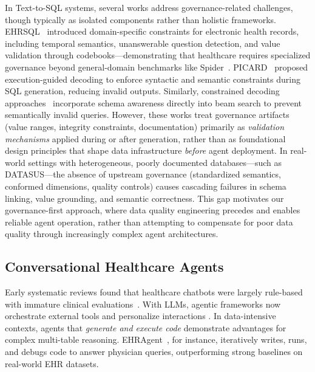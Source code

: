 \documentclass[sigconf,natbib=false]{acmart}
\begin{document}
In Text-to-SQL systems, several works address governance-related challenges, though typically as isolated components rather than holistic frameworks. EHRSQL~\cite{lee2023ehrsql} introduced domain-specific constraints for electronic health records, including temporal semantics, unanswerable question detection, and value validation through codebooks—demonstrating that healthcare requires specialized governance beyond general-domain benchmarks like Spider~\cite{yu2018spider}. PICARD~\cite{scholak2021picard} proposed execution-guided decoding to enforce syntactic and semantic constraints during SQL generation, reducing invalid outputs. Similarly, constrained decoding approaches~\cite{wang2018eg} incorporate schema awareness directly into beam search to prevent semantically invalid queries. However, these works treat governance artifacts (value ranges, integrity constraints, documentation) primarily as \emph{validation mechanisms} applied during or after generation, rather than as foundational design principles that shape data infrastructure \emph{before} agent deployment. In real-world settings with heterogeneous, poorly documented databases—such as DATASUS—the absence of upstream governance (standardized semantics, conformed dimensions, quality controls) causes cascading failures in schema linking, value grounding, and semantic correctness. This gap motivates our governance-first approach, where data quality engineering precedes and enables reliable agent operation, rather than attempting to compensate for poor data quality through increasingly complex agent architectures.



\subsection{Conversational Healthcare Agents}
Early systematic reviews found that healthcare chatbots were largely rule-based with immature clinical evaluations~\cite{laranjo2018}. With LLMs, agentic frameworks now orchestrate external tools and personalize interactions \cite{opencha2025}. In data-intensive contexts, agents that \emph{generate and execute code} demonstrate advantages for complex multi-table reasoning. EHRAgent~\cite{ehragent2024}, for instance, iteratively writes, runs, and debugs code to answer physician queries, outperforming strong baselines on real-world EHR datasets.
\end{document}
